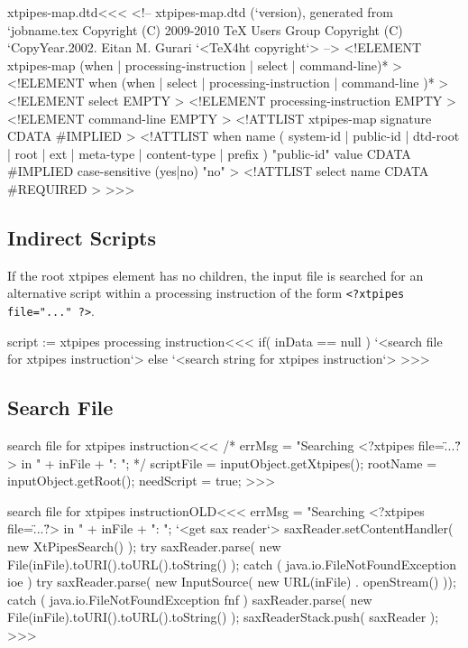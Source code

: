 \documentclass{article}
\begin{document}
{\<xtpipes-map.dtd\><<<
<!-- xtpipes-map.dtd (`version), generated from `jobname.tex
     Copyright (C) 2009-2010 TeX Users Group
     Copyright (C) `CopyYear.2002. Eitan M. Gurari
`<TeX4ht copyright`> -->
<!ELEMENT xtpipes-map (when | processing-instruction
                            | select
                            | command-line)*  >
<!ELEMENT when (when | select
                     | processing-instruction
                     | command-line )*  >
<!ELEMENT select EMPTY >
<!ELEMENT processing-instruction EMPTY >
<!ELEMENT command-line EMPTY >
<!ATTLIST xtpipes-map
          signature      CDATA #IMPLIED
>
<!ATTLIST when
          name   (
                    system-id
                  | public-id
                  | dtd-root
                  | root
                  | ext
                  | meta-type
                  | content-type
                  | prefix      )  "public-id"
          value   CDATA #IMPLIED
          case-sensitive (yes|no) "no"
>
<!ATTLIST select
          name      CDATA #REQUIRED
>
>>>


\subsection{Indirect Scripts}



If the root xtpipes element has no children, the input file is
searched for an alternative script within a processing instruction of
the form \verb+<?xtpipes file="..." ?>+.

\<script := xtpipes processing instruction\><<<
if( inData == null ){
   `<search file for xtpipes instruction`>
} else {
   `<search string for xtpipes instruction`>
}
>>>


\subsection{Search File}




\<search file for xtpipes instruction\><<<
/*
errMsg = "Searching <?xtpipes file=\"...\"?>  in "
                      + inFile + ": ";
*/
scriptFile = inputObject.getXtpipes();
rootName = inputObject.getRoot();
needScript = true;
>>>

\<search file for xtpipes instructionOLD\><<<
errMsg = "Searching <?xtpipes file=\"...\"?>  in "
                      + inFile + ": ";
       `<get sax reader`>
       saxReader.setContentHandler( new XtPipesSearch() );
try{
    saxReader.parse( new File(inFile).toURI().toURL().toString() );
} catch ( java.io.FileNotFoundException ioe ){
    try{
       saxReader.parse( new InputSource(
                        new URL(inFile) . openStream() ));
    } catch ( java.io.FileNotFoundException fnf ){
        saxReader.parse( new File(inFile).toURI().toURL().toString() );
}   }
       saxReaderStack.push( saxReader );
>>>

}
\end{document}
